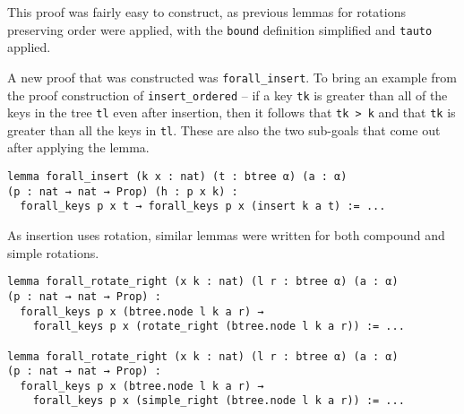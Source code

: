 This proof was fairly easy to construct, as previous lemmas for rotations preserving order were applied, with the \lstinline{bound} definition simplified and \lstinline{tauto} applied.

A new proof that was constructed was \lstinline{forall_insert}. To bring an example from the proof construction of \lstinline{insert_ordered} -- if a key \lstinline{tk} is greater than all of the keys in the tree \lstinline{tl} even after insertion, then it follows that \lstinline{tk > k} and that \lstinline{tk} is greater than all the keys in \lstinline{tl}. These are also the two sub-goals that come out after applying the lemma.

\begin{lstlisting}
lemma forall_insert (k x : nat) (t : btree α) (a : α) 
(p : nat → nat → Prop) (h : p x k) :
  forall_keys p x t → forall_keys p x (insert k a t) := ...
\end{lstlisting}

As insertion uses rotation, similar lemmas were written for both compound and simple rotations.

\begin{lstlisting}
lemma forall_rotate_right (x k : nat) (l r : btree α) (a : α) 
(p : nat → nat → Prop) :
  forall_keys p x (btree.node l k a r) → 
    forall_keys p x (rotate_right (btree.node l k a r)) := ...

lemma forall_rotate_right (x k : nat) (l r : btree α) (a : α) 
(p : nat → nat → Prop) :
  forall_keys p x (btree.node l k a r) → 
    forall_keys p x (simple_right (btree.node l k a r)) := ...
\end{lstlisting}
